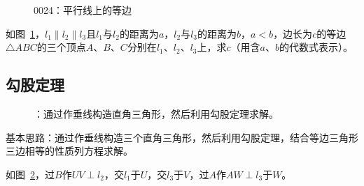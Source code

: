 

\begin{figure}[htbp]
  \centering
  \caption{0024：平行线上的等边} \label{fig:0024}
\end{figure}

如图~\ref{fig:0024}，$l_1 \parallel l_2 \parallel l_3$且$l_1$与$l_2$的距离为$a$，$l_2$与$l_3$的距离为$b$，$a < b$，边长为$c$的等边$\triangle ABC$的三个顶点$A$、$B$、$C$分别在$l_1$、$l_2$、$l_3$上，求$c$（用含$a$、$b$的代数式表示）。


\subsection{勾股定理} \label{subsec:0024-pyth}

\begin{figure}[htbp]
  \centering
  \caption{：通过作垂线构造直角三角形，然后利用勾股定理求解。}
  \label{fig:0024-pyth}
\end{figure}

基本思路：通过作垂线构造三个直角三角形，然后利用勾股定理，结合等边三角形三边相等的性质列方程求解。

如图~\ref{fig:0024-pyth}，过$B$作$UV \perp l_2$，交$l_1$于$U$，交$l_3$于$V$，过$A$作$AW \perp l_3$于$W$。

